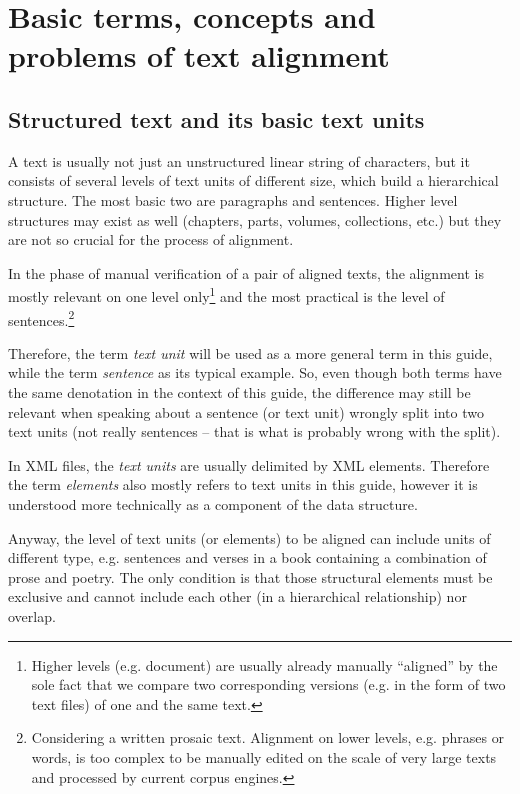 \documentclass[a4paper,10pt,oneside]{book}
\begin{document}
\chapter{Basic terms, concepts and problems of text alignment}\label{ch:intro:albasics}

\section{Structured text and its basic text units}\label{ch:intro:albasics:textstruc}

A text is usually not just an unstructured linear string of characters, but it consists of several levels of text units of different size, which build a hierarchical structure. The most basic two are paragraphs and sentences. Higher level structures may exist as well (chapters, parts, volumes, collections, etc.) but they are not so crucial for the process of alignment.

In the phase of manual verification of a pair of aligned texts, the alignment is mostly relevant on one level only\footnote{Higher levels (e.g. document) are usually already manually ``aligned'' by the sole fact that we compare two corresponding versions (e.g. in the form of two text files) of one and the same text.} and the most practical is the level of sentences.\footnote{Considering a written prosaic text. Alignment on lower levels, e.g. phrases or words, is too complex to be manually edited on the scale of very large texts and processed by current corpus engines.}

Therefore, the term \emph{text unit} will be used as a more general term in this guide, while the term \emph{sentence} as its typical example. So, even though both terms have the same denotation in the context of this guide, the difference may still be relevant when speaking about a sentence (or text unit) wrongly split into two text units (not really sentences -- that is what is probably wrong with the split).

In XML files, the \emph{text units} are usually delimited by XML elements. Therefore the term \emph{elements} also mostly refers to text units in this guide, however it is understood more technically as a component of the data structure.

Anyway, the level of text units (or elements) to be aligned can include units of different type, e.g. sentences and verses in a book containing a combination of prose and poetry. The only condition is that those structural elements must be exclusive and cannot include each other (in a hierarchical relationship) nor overlap.
\end{document}
